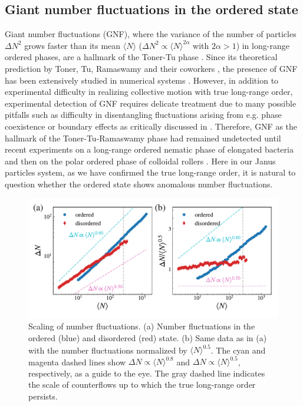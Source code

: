 \documentclass[%
 reprint,
 amsmath,amssymb,
 aps,
 floatfix
]{revtex4-2}
\begin{document}
\subsection{Giant number fluctuations in the ordered state}
Giant number fluctuations (GNF), where the variance of the number of particles $\Delta N^2$ grows faster than its mean $\langle N\rangle$ ($\Delta N^2\propto\langle N\rangle^{2\alpha}$ with $2\alpha>1$) in long-range ordered phases, are a hallmark of the Toner-Tu phase \cite{tonertu95, tonertu98, toner2012}. 
Since its theoretical prediction by Toner, Tu, Ramaswamy and their coworkers \cite{tonertu95, tonertu98, toner2005}, the presence of GNF has been extensively studied in numerical systems \cite{ramaswamy2003, chate2008, ginelli2010, benoit2019}. However, in addition to experimental difficulty in realizing collective motion with true long-range order, experimental detection of GNF requires delicate treatment due to many possible pitfalls such as difficulty in disentangling fluctuations arising from e.g. phase coexistence or boundary effects as critically discussed in \cite{nishiguchi2017}. Therefore, GNF as the hallmark of the Toner-Tu-Ramaswamy phase had remained undetected until recent experiments on a long-range ordered nematic phase of elongated bacteria \cite{nishiguchi2017} and then on the polar ordered phase of colloidal rollers \cite{bartolo2018}.
Here in our Janus particles system, as we have confirmed the true long-range order, it is natural to question whether the ordered state shows anomalous number fluctuations.

\begin{figure}[t!]
\includegraphics[width=\columnwidth]{num_fluc-2.pdf}
\caption{\label{num_fluc} Scaling of number fluctuations. (a) Number fluctuations in the ordered (blue) and disordered (red) state. (b) Same data as in (a) with the number fluctuations normalized by $\langle N\rangle^{0.5}$. The cyan and magenta dashed lines show $\Delta N \propto \langle N\rangle^{0.8}$ and $\Delta N \propto \langle N\rangle^{0.5}$, respectively, as a guide to the eye. The gray dashed line indicates the scale of counterflows up to which the true long-range order persists.}
\end{figure}
\end{document}
